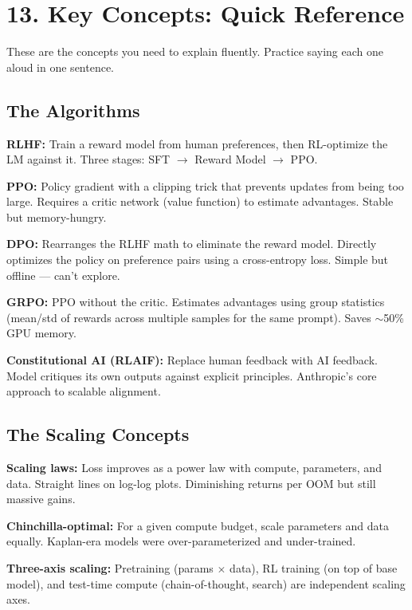 \section{13. Key Concepts: Quick Reference}

These are the concepts you need to explain fluently. Practice saying each one aloud in one sentence.

\subsection{The Algorithms}

\textbf{RLHF:} Train a reward model from human preferences, then RL-optimize the LM against it. Three stages: SFT $\to$ Reward Model $\to$ PPO.

\textbf{PPO:} Policy gradient with a clipping trick that prevents updates from being too large. Requires a critic network (value function) to estimate advantages. Stable but memory-hungry.

\textbf{DPO:} Rearranges the RLHF math to eliminate the reward model. Directly optimizes the policy on preference pairs using a cross-entropy loss. Simple but offline --- can't explore.

\textbf{GRPO:} PPO without the critic. Estimates advantages using group statistics (mean/std of rewards across multiple samples for the same prompt). Saves $\sim$50\% GPU memory.

\textbf{Constitutional AI (RLAIF):} Replace human feedback with AI feedback. Model critiques its own outputs against explicit principles. Anthropic's core approach to scalable alignment.

\subsection{The Scaling Concepts}

\textbf{Scaling laws:} Loss improves as a power law with compute, parameters, and data. Straight lines on log-log plots. Diminishing returns per OOM but still massive gains.

\textbf{Chinchilla-optimal:} For a given compute budget, scale parameters and data equally. Kaplan-era models were over-parameterized and under-trained.

\textbf{Three-axis scaling:} Pretraining (params $\times$ data), RL training (on top of base model), and test-time compute (chain-of-thought, search) are independent scaling axes.

